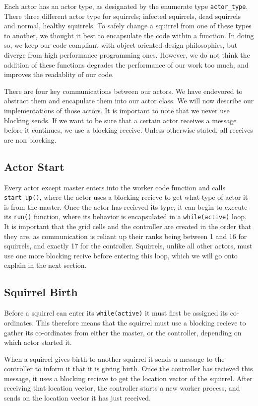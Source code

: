 \documentclass[oneside]{article}
\begin{document}
 Each actor has an actor type, as designated by the enumerate type \texttt{actor\_type}. There three different actor type for squirrels; infected squirrels, dead squirrels and normal, healthy squirrels. To safely change a squirrel from one of these types to another, we thought it best to encapsulate the code within a function. In doing so, we keep our code compliant with object oriented design philosophies, but diverge from high performance programming ones. However, we do not think the addition of these functions degrades the performance of our work too much, and improves the readablity of our code.

 There are four key communications between our actors. We have endevored to abstract them and encapulate them into our actor class. We will now describe our implementations of those actors. It is important to note that we never use blocking sends. If we want to be sure that a certain actor receives a message before it continues, we use a blocking receive. Unless otherwise stated, all receives are non blocking.

 \subsection{Actor Start}
 Every actor except master enters into the worker code function and calls \texttt{start\_up()}, where the actor uses a blocking recieve to get what type of actor it is from the master. Once the actor has recieved its type, it can begin to execute its \texttt{run()} function, where its behavior is encapsulated in a \texttt{while(active)} loop. It is important that the grid cells and the controller are created in the order that they are, as communication is reliant up their ranks being between 1 and 16 for squirrels, and exactly 17 for the controller. Squirrels, unlike all other actors, must use one more blocking recive before entering this loop, which we will go onto explain in the next section.
\subsection{Squirrel Birth}
Before a squirrel can enter its \texttt{while(active)} it must first be assigned its co-ordinates. This therefore means that the squirrel must use a blocking recieve to gather its co-ordinates from either the master, or the controller, depending on which actor started it.

When a squirrel gives birth to another squirrel it sends a message to the controller to inform it that it is giving birth. Once the controller has recieved this message, it uses a blocking recieve to get the location vector of the squirrel. After receiving that location vector, the controller starts a new worker process, and sends on the location vector it has just received.
\end{document}
